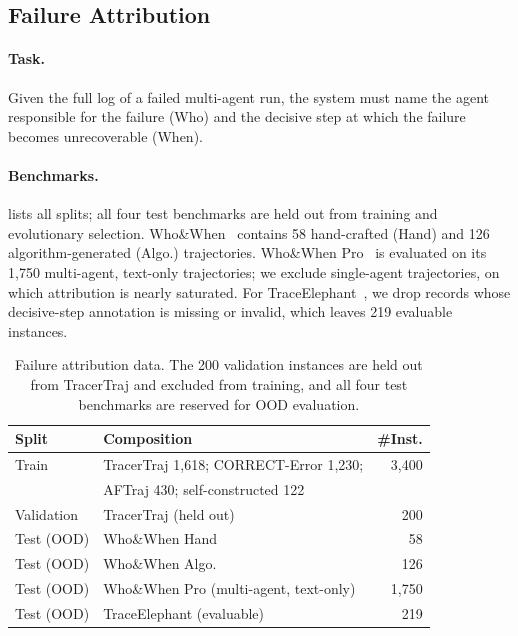\documentclass[11pt,a4paper]{article}
\begin{document}
\subsection{Failure Attribution}
\label{app:failure}

\paragraph{Task.}
Given the full log of a failed multi-agent run, the system must name the agent responsible for the failure (Who) and the decisive step at which the failure becomes unrecoverable (When).

\paragraph{Benchmarks.}
 lists all splits; all four test benchmarks are held out from training and evolutionary selection. Who\&When~\citep{zhang2025agentcausestaskfailures} contains 58 hand-crafted (Hand) and 126 algorithm-generated (Algo.) trajectories. Who\&When Pro~\citep{liu2026whowhenprollmsreally} is evaluated on its 1,750 multi-agent, text-only trajectories; we exclude single-agent trajectories, on which attribution is nearly saturated. For TraceElephant~\citep{chen2026seeingelephantbenchmarkfailure}, we drop records whose decisive-step annotation is missing or invalid, which leaves 219 evaluable instances.

\begin{table}[t]
\centering
\footnotesize
\caption{Failure attribution data. The 200 validation instances are held out from TracerTraj and excluded from training, and all four test benchmarks are reserved for OOD evaluation.}
\label{tab:app-whowhen-data}
\renewcommand{\arraystretch}{1.05}
\setlength{\tabcolsep}{3pt}
\begin{tabular}{llr}
\toprule
\textbf{Split} & \textbf{Composition} & \textbf{\#Inst.} \\
\midrule
Train & TracerTraj 1,618; CORRECT-Error 1,230; & 3,400 \\
      & AFTraj 430; self-constructed 122 & \\
Validation & TracerTraj (held out) & 200 \\
\midrule
Test (OOD) & Who\&When Hand & 58 \\
Test (OOD) & Who\&When Algo. & 126 \\
Test (OOD) & Who\&When Pro (multi-agent, text-only) & 1,750 \\
Test (OOD) & TraceElephant (evaluable) & 219 \\
\bottomrule
\end{tabular}
\end{table}
\end{document}
